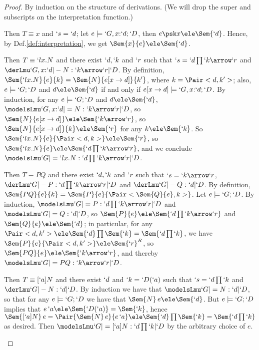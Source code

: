 \documentclass{lmcs}
\begin{document}
 \begin{proof}
By induction on the structure of derivations.
(We will drop the super and subscripts on the interpretation function.)

 \begin{description} \itemsep 3pt

 \item [$ \Axiom $] 
Then $T \equiv x$ and $`s = `d$; let $e \models `G,x{:}`d;`D $, then $e\psk x \ele \Sem{`d}$. 
Hence, by Def.\skp\ref{def:interpretation}, we get $ \Sem{ x }{ e } \ele \Sem{`d}$.

 \item [$ \LAbs $] 
Then $T \equiv `lx.N$ and there exist $`d, `k$ and $`r$ such that $ `s = `d\prod `k\arrow `r$ and $ \derLmu `G,x{:}`d |- N : `k\arrow `r | `D $.
By definition, $ \Sem{ `lx.N }{ e }{ k } = \Sem{ N }{ e[x\to d] }{ k' } $, where $k = \Pair<d,k'>$; also, $e \models `G;`D $ and $ d \ele \Sem{`d} $ if and only if $ e[x \to d] \models`G,x{:}`d;`D $.
By induction, for any $e \models `G;`D $ and $d \ele \Sem{`d}$, $ \modelsLmu `G,x{:}`d |= N : `k\arrow `r | `D $, so $ \Sem{ N }{ e[x\to d] } \ele \Sem{ `k\arrow `r }$, so $ \Sem{ N }{ e[x\to d] }{ k } \ele \Sem{ `r }$ for any $k \ele \Sem{ `k }$. 
So $ \Sem{ `lx.N }{ e }{ \Pair<d,k> } \ele \Sem{ `r }$, so $ \Sem{ `lx.N }{ e } \ele \Sem{ `d\prod `k\arrow `r}$, and we conclude $ \modelsLmu `G |= `lx.N : `d\prod `k\arrow `r | `D $. 


 \item [$ \App $] 
Then $T \equiv PQ$ and there exist $`d, `k$ and $`r$ such that $ `s = `k\arrow `r$, $ \derLmu `G |- P : `d\prod `k\arrow `r | `D $ and $ \derLmu `G |- Q : `d | `D $.
By definition, $ \Sem{ PQ }{ e }{ k } = \Sem{ P }{ e }{ \Pair< \Sem{ Q }{ e } , k > } $.
Let $e \models `G;`D $.
By induction, $ \modelsLmu `G |= P : `d\prod `k\arrow `r | `D $ and $ \modelsLmu `G |= Q : `d | `D $, so $ \Sem{ P }{ e } \ele \Sem{ `d\prod `k\arrow `r }$ and $ \Sem{ Q }{ e } \ele \Sem{`d}$; in particular, for any $ \Pair<d,k'> \ele \Sem{`d}\prod \Sem{ `k } = \Sem{ `d\prod `k }$, we have $ \Sem{ P }{ e }{ \Pair<d,k'> } \ele \Sem{ `r }^R$, so $ \Sem{ PQ }{ e } \ele \Sem{ `k\arrow `r}$, and thereby $ \modelsLmu `G |= PQ : `k\arrow `r | `D $.


 \item [$ \TCmd $] 
Then $T \equiv [`a]N$ and there exist $`d$ and $`k = `D(`a)$ such that $`s = `d\prod `k$ and $ \derLmu `G |- N : `d | `D $.
By induction we have that $ \modelsLmu `G |= N : `d | `D $, so that for any $e \models `G;`D $ we have that $\Sem{N}\,e \ele \Sem{`d}$. 
But $e \models `G;`D $ implies that $e\,`a \ele \Sem{`D(`a)} = \Sem{`k}$, hence 
$\Sem{[`a]N}\, e = \Pair{\Sem{N}\,e}{e\,`a} \ele \Sem{`d}\prod\Sem{`k} =\Sem{`d\prod`k}$ as desired. 
Then $ \modelsLmu `G |= [`a]N : `d\prod`k | `D $ by the arbitrary choice of $e$.



\end{description}
\end{proof}
\end{document}

